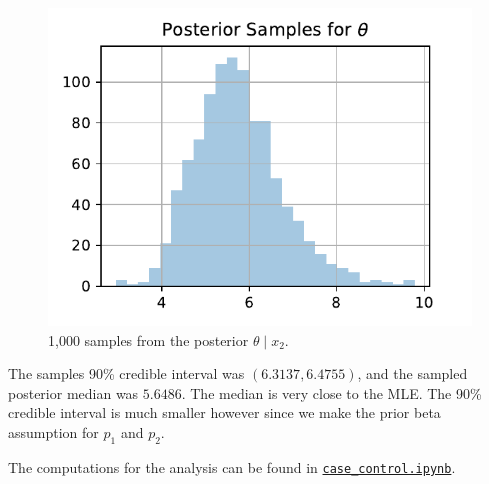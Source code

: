 \documentclass[letterpaper,11pt]{article}
\begin{document}
\begin{enumerate}
\begin{enumerate}
\begin{description}
      \begin{figure}        
        \centering
        \includegraphics{p1_theta.pdf}
        \caption{1,000 samples from the posterior $\theta \mid x_2$.}
        \label{fig:p1_theta_dist}
      \end{figure}

      The samples 90\% credible interval was $(6.3137, 6.4755)$, and the sampled
      posterior median was $5.6486$. The median is very close to the MLE. The
      90\% credible interval is much smaller however since we make the prior
      beta assumption for $p_1$ and $p_2$.

      The computations for the analysis can be found in
      \href{https://nbviewer.jupyter.org/github/ppham27/stat570/blob/master/hw5/case\_control.ipynb}{\texttt{case\_control.ipynb}}.
    \end{description}
    

\end{enumerate}
\end{enumerate}
\end{document}
